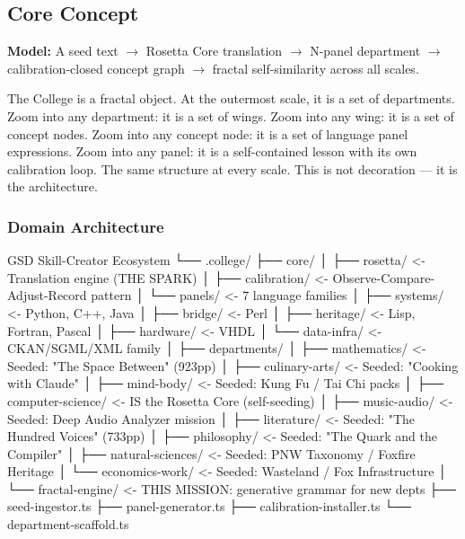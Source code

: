 \documentclass[11pt,letterpaper]{article}
\begin{document}
\subsection{Core Concept}

\textbf{Model:} A seed text $\rightarrow$ Rosetta Core translation $\rightarrow$ N-panel department $\rightarrow$ calibration-closed concept graph $\rightarrow$ fractal self-similarity across all scales.

The College is a fractal object. At the outermost scale, it is a set of departments. Zoom into any department: it is a set of wings. Zoom into any wing: it is a set of concept nodes. Zoom into any concept node: it is a set of language panel expressions. Zoom into any panel: it is a self-contained lesson with its own calibration loop. The same structure at every scale. This is not decoration --- it is the architecture.

\subsubsection{Domain Architecture}

\begin{asciibox}
GSD Skill-Creator Ecosystem
  └── .college/
       ├── core/
       │    ├── rosetta/          <- Translation engine (THE SPARK)
       │    ├── calibration/      <- Observe-Compare-Adjust-Record pattern
       │    └── panels/           <- 7 language families
       │         ├── systems/     <- Python, C++, Java
       │         ├── bridge/      <- Perl
       │         ├── heritage/    <- Lisp, Fortran, Pascal
       │         ├── hardware/    <- VHDL
       │         └── data-infra/  <- CKAN/SGML/XML family
       │
       ├── departments/
       │    ├── mathematics/      <- Seeded: "The Space Between" (923pp)
       │    ├── culinary-arts/    <- Seeded: "Cooking with Claude"
       │    ├── mind-body/        <- Seeded: Kung Fu / Tai Chi packs
       │    ├── computer-science/ <- IS the Rosetta Core (self-seeding)
       │    ├── music-audio/      <- Seeded: Deep Audio Analyzer mission
       │    ├── literature/       <- Seeded: "The Hundred Voices" (733pp)
       │    ├── philosophy/       <- Seeded: "The Quark and the Compiler"
       │    ├── natural-sciences/ <- Seeded: PNW Taxonomy / Foxfire Heritage
       │    └── economics-work/   <- Seeded: Wasteland / Fox Infrastructure
       │
       └── fractal-engine/       <- THIS MISSION: generative grammar for new depts
            ├── seed-ingestor.ts
            ├── panel-generator.ts
            ├── calibration-installer.ts
            └── department-scaffold.ts
\end{asciibox}
\end{document}
